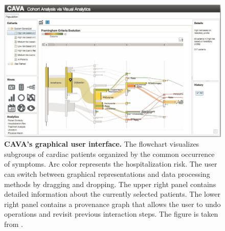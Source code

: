 \documentclass[
  oneside]{book}
\begin{document}
\begin{figure}[htb]

{\centering \includegraphics[width=1\linewidth]{figures/03-cava} 

}

\caption{\textbf{CAVA's graphical user interface.} The flowchart visualizes subgroups of cardiac patients organized by the common occurrence of symptoms. Arc color represents the hospitalization risk. The user can switch between graphical representations and data processing methods by dragging and dropping. The upper right panel contains detailed information about the currently selected patients. The lower right panel contains a provenance graph that allows the user to undo operations and revisit previous interaction steps. The figure is taken from \autocite{Zhang:CAVA2015}.}\label{fig:03-cava}
\end{figure}
\end{document}
